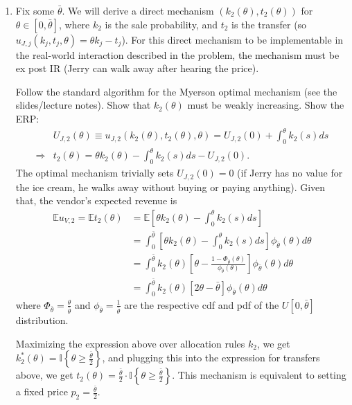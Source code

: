 \documentclass[a4paper]{article}
\begin{document}
\begin{enumerate}
	\item Fix some $\bar{\theta}$. We will derive a direct mechanism $(k_2(\theta),t_2(\theta))$ for $\theta \in [0,\bar{\theta}]$, where $k_2$ is the sale probability, and $t_2$ is the transfer (so $u_{J,j} \left( k_j,t_j,\theta \right) = \theta k_j - t_j$). For this direct mechanism to be implementable in the real-world interaction described in the problem, the mechanism must be ex post IR (Jerry can walk away after hearing the price).%
	
	Follow the standard algorithm for the Myerson optimal mechanism (see the slides/lecture notes). Show that $k_2(\theta)$ must be weakly increasing. Show the ERP:
	\begin{align*}
		&U_{J,2}(\theta) \equiv u_{J,2} \left( k_2(\theta),t_2(\theta),\theta \right) 
		= U_{J,2}(0) + \int_0^\theta k_2(s) ds
		\\
		\Rightarrow &
		t_2(\theta) = \theta k_2(\theta) - \int_0^\theta k_2(s) ds - U_{J,2}(0).
	\end{align*}
	The optimal mechanism trivially sets $U_{J,2}(0) = 0$ (if Jerry has no value for the ice cream, he walks away without buying or paying anything). Given that, the vendor's expected revenue is
	\begin{align*}
		\mathbb{E}u_{V,2} = \mathbb{E} t_2(\theta) 
		&= \mathbb{E} \left[ \theta k_2(\theta) - \int_0^\theta k_2(s) ds \right]
		\\
		&= \int_0^{\bar{\theta}} \left[ \theta k_2(\theta) - \int_0^\theta k_2(s) ds \right] \phi_{\bar{\theta}} (\theta) d\theta 
		\\
		&= \int_0^{\bar{\theta}} k_2(\theta) \left[ \theta - \frac{1-\Phi_{\bar{\theta}}(\theta)}{\phi_{\bar{\theta}}(\theta)} \right] \phi_{\bar{\theta}} (\theta) d\theta
		\\
		&= \int_0^{\bar{\theta}} k_2(\theta) \left[ 2\theta - \bar{\theta} \right] \phi_{\bar{\theta}} (\theta) d\theta
	\end{align*}
	where $\Phi_{\bar{\theta}} = \frac{\theta}{\bar{\theta}}$ and $\phi_{\bar{\theta}} = \frac{1}{\bar{\theta}}$ are the respective cdf and pdf of the $U[0,\bar{\theta}]$ distribution.
	
	Maximizing the expression above over allocation rules $k_2$, we get $k_2^*(\theta) = \mathbb{I} \left\{ \theta \geq \frac{\bar{\theta}}{2} \right\}$, and plugging this into the expression for transfers above, we get $t_2(\theta) = \frac{\bar{\theta}}{2} \cdot \mathbb{I} \left\{ \theta \geq \frac{\bar{\theta}}{2} \right\}$. This mechanism is equivalent to setting a fixed price $p_2 = \frac{\bar{\theta}}{2}$.
	

\end{enumerate}
\end{document}
